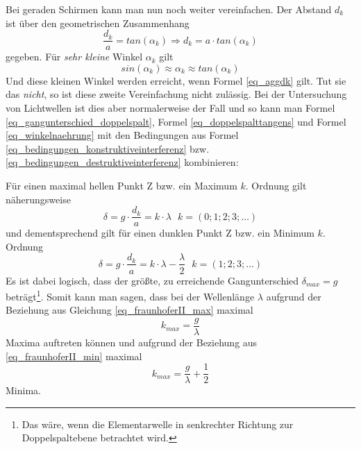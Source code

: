 Bei geraden Schirmen kann man nun noch weiter vereinfachen. Der Abstand \(d_k\) ist über den geometrischen Zusammenhang
\begin{equation}
 	\frac{d_k}{a} = tan(\alpha_k) \Rightarrow d_k = a \cdot tan(\alpha_k)
 		\label{eq_doppelspalttangens}
\end{equation}
gegeben. Für \emph{sehr kleine} Winkel \(\alpha_k\) gilt
\begin{equation}
 	sin(\alpha_k) \approx \alpha_k \approx tan(\alpha_k)
 		\label{eq_winkelnaehrung}
\end{equation}
Und diese kleinen Winkel werden erreicht, wenn Formel \ref{eq_aggdk} gilt. Tut sie das \emph{nicht}, so ist diese zweite Vereinfachung nicht zulässig. Bei der Untersuchung von Lichtwellen ist dies aber normalerweise der Fall und so kann man Formel \ref{eq_gangunterschied_doppelspalt}, Formel \ref{eq_doppelspalttangens} und Formel \ref{eq_winkelnaehrung} mit den Bedingungen aus Formel \ref{eq_bedingungen_konstruktiveinterferenz} bzw. \ref{eq_bedingungen_destruktiveinterferenz} kombinieren:

Für einen maximal hellen Punkt Z bzw. ein Maximum \(k\). Ordnung gilt näherungsweise
\begin{equation}
 \delta = g \cdot \frac{d_k}{a} = k \cdot \lambda ~~~ k = (0; 1; 2; 3; \ldots)
 \label{eq_fraunhoferII_max}
\end{equation}
und dementsprechend gilt für einen dunklen Punkt Z bzw. ein Minimum \(k\). Ordnung
\begin{equation}
 \delta = g \cdot \frac{d_k}{a} = k \cdot \lambda - \frac{\lambda}{2} ~~~ k = (1; 2; 3; \ldots)
 \label{eq_fraunhoferII_min}
\end{equation}
Es ist dabei logisch, dass der größte, zu erreichende Gangunterschied \(\delta_{max} = g\) beträgt\footnote{Das wäre, wenn die Elementarwelle in senkrechter Richtung zur Doppelspaltebene betrachtet wird.}. Somit kann man sagen, dass bei der Wellenlänge \(\lambda\) aufgrund der Beziehung aus Gleichung \ref{eq_fraunhoferII_max} maximal
\begin{equation}
   k_{max} = \frac{g}{\lambda}
\end{equation}
Maxima auftreten können und aufgrund der Beziehung aus \ref{eq_fraunhoferII_min} maximal
\begin{equation}
   k_{max} = \frac{g}{\lambda} + \frac{1}{2}
\end{equation}
Minima.




